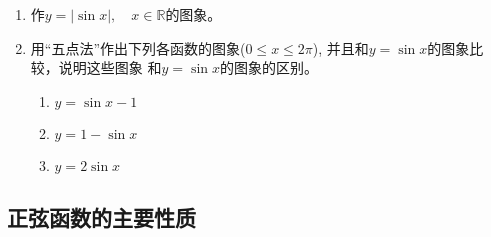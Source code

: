 \begin{ex}
    \begin{enumerate}
        \item 作$y=|\sin x|,\quad x\in\mathbb{R}$的图象。
        \item 用“五点法”作出下列各函数的图象($0\le x\le 2\pi$), 并且和$y=\sin x$的图象比较，说明这些图象 和$y=\sin x$的图象的区别。
        \begin{enumerate}
            \item $y=\sin x-1$
            \item $y=1-\sin x$
          \item $y=2\sin x$
        \end{enumerate}
    \end{enumerate}
\end{ex}

\subsection{正弦函数的主要性质}

